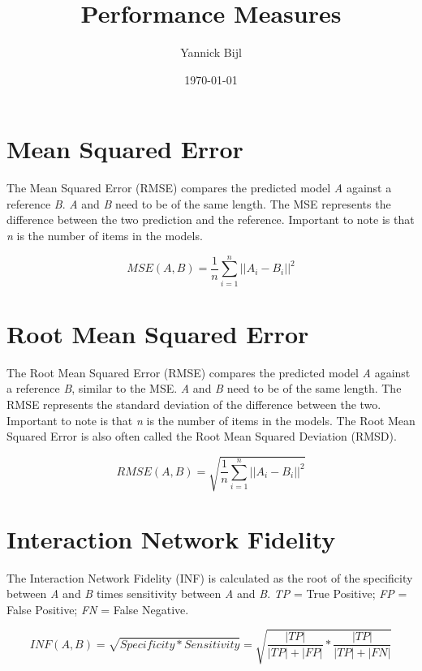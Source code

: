 \documentclass{article}
\title{Performance Measures}
\author{Yannick Bijl}
\date{\today}
\begin{document}
\maketitle

\tableofcontents
\newpage


\section{Mean Squared Error}
The Mean Squared Error (RMSE) compares the predicted model \textit{A} against a reference \textit{B}. \textit{A} and \textit{B} need to be of the same length. The MSE represents the difference between the two prediction and the reference. Important to note is that \textit{n} is the number of items in the models.

\begin{equation}
    \label{eq:mse}
    MSE(A, B) = \frac{1}{n} \sum_{i=1}^{n} ||A_i - B_i||^2
\end{equation}

\section{Root Mean Squared Error}
The Root Mean Squared Error (RMSE) compares the predicted model \textit{A} against a reference \textit{B}, similar to the MSE. \textit{A} and \textit{B} need to be of the same length. The RMSE represents the standard deviation of the difference between the two. Important to note is that \textit{n} is the number of items in the models. The Root Mean Squared Error is also often called the Root Mean Squared Deviation (RMSD).

\begin{equation}
    \label{eq:rmse}
    RMSE(A, B) = \sqrt{\frac{1}{n} \sum_{i=1}^{n} ||A_i - B_i||^2}
\end{equation}

\section{Interaction Network Fidelity}
The Interaction Network Fidelity (INF) is calculated as the root of the specificity between \textit{A} and \textit{B} times sensitivity between \textit{A} and \textit{B}. \textit{TP} = True Positive; \textit{FP} = False Positive; \textit{FN} = False Negative.

\begin{equation}
    \label{eq:inf}
    INF(A, B) = \sqrt{Specificity * Sensitivity} = \sqrt{\frac{|TP|}{|TP| + |FP|} * \frac{|TP|}{|TP| + |FN|}}
\end{equation}
\end{document}
